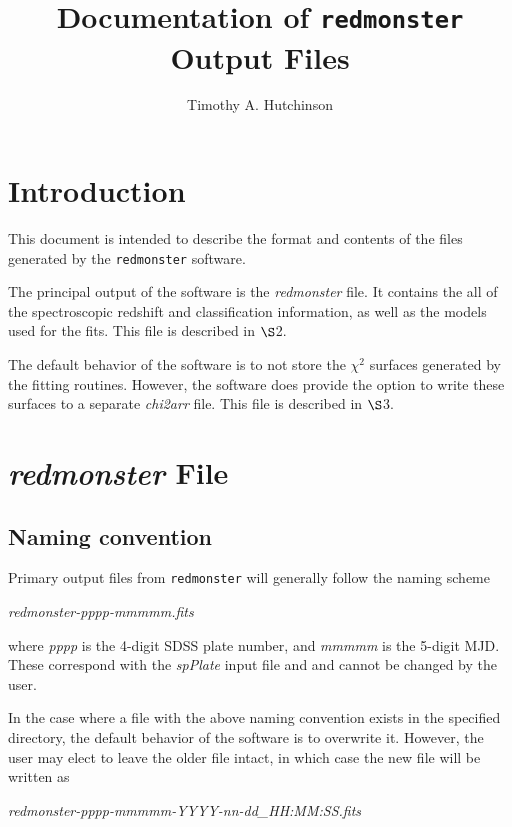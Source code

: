\documentclass[12pt]{article}
\begin{document}
\title{Documentation of \texttt{redmonster} Output Files}

\author{Timothy A. Hutchinson}

\maketitle

\section{Introduction}

This document is intended to describe the format and contents of the files
generated by the \texttt{redmonster} software.

The principal output of the software is the \textit{redmonster} file.  It contains the all of the
spectroscopic redshift and classification information, as well as the models used for the fits.
This file is described in $\S$2.

The default behavior of the software is to not store the $\chi^2$ surfaces generated by
the fitting routines.  However, the software does provide the option to write these surfaces
to a separate \textit{chi2arr} file.  This file is described in $\S$3.

\section{\textit{redmonster} File}

\subsection{Naming convention}

Primary output files from \texttt{redmonster} will generally follow the naming scheme

\hspace*{36pt}\textit{redmonster-pppp-mmmmm.fits}

where \textit{pppp} is the 4-digit SDSS plate number, and \textit{mmmmm}
is the 5-digit MJD.  These correspond with the \textit{spPlate} input file and
and cannot be changed by the user.

In the case where a file with the above naming convention exists in the specified directory, 
the default behavior of the software is to overwrite it.  However, the user may 
elect to leave the older file intact, in which case the new file will be written as

\hspace*{36pt}\textit{redmonster-pppp-mmmmm-YYYY-nn-dd\_HH:MM:SS.fits}
\end{document}
